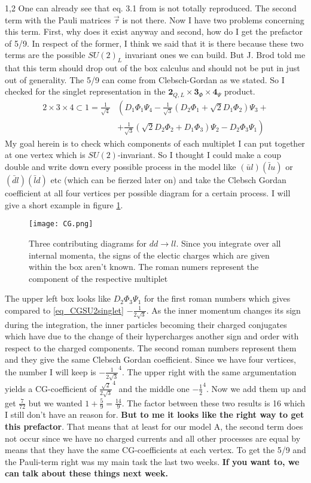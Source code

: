 \documentclass[11pt,a4paper,twoside]{article}
\begin{document}
\begin{spacing}{1,2}
One can already see that eq. 3.1 from \cite{Grip} is not totally reproduced. The second term with the Pauli matrices $\vec \tau$ is not there.
Now I have two problems concerning this term. First, why does it exist anyway and second, how do I get the prefactor of 5/9. In respect of the former, I think
we said that it is there because these two terms are the possible $SU(2)_L$ invariant ones we can build. But J. Brod told me that this term should drop out 
of the box calculus and should not be put in just out of generality. The 5/9 can come from Clebsch-Gordan as we stated. So I checked for the singlet
representation in the $\textbf{2}_{Q,L}\times\textbf{3}_\Phi\times\textbf{4}_\Psi$ product. 
\begin{align}
 \nonumber
 2\times3\times4 \subset 1 =\frac{1}{\sqrt4}&\left(D_1\Phi_1\Psi_4 - \frac{1}{\sqrt{3}}(D_2\Phi_1+\sqrt{2}D_1\Phi_2)\Psi_3  + \right. \\ 
  &+\left.\frac{1}{\sqrt{3}}(\sqrt{2}D_2\Phi_2+D_1\Phi_3)\Psi_2 - D_2\Phi_3\Psi_1  \right)
\label{eq_CGSU2singlet}
 \end{align}
My goal herein is to check which components of each multiplet I can put together at one vertex which is $SU(2)$-invariant. So I thought I could make a 
coup double and write down every possible process in the model like $(\bar u l)(\bar l u)$ or $(\bar d l)(\bar l d)$ etc (which can be fierzed later on)
and take the Clebsch Gordan coefficient at all four vertices per possible diagram for a certain process. I will give a short example in figure \ref{pic_CG}.
\begin{figure}[t]
 \texttt{[image: CG.png]}
 \caption{Three contributing diagrams for $dd\rightarrow ll$. Since you integrate over all internal momenta, the signs of the electic charges which are given
 within the box aren't known. The roman numers represent the component of the respective multiplet}
 \label{pic_CG}
\end{figure}
The upper left box looks like $D_2\Phi_3\Psi_1$ for the first roman numbers which gives compared to \eqref{eq_CGSU2singlet}  $-\frac{1}{2\sqrt{3}}$. 
As the inner momentum changes its sign during the integration, the inner particles becoming their charged conjugates which have due to the change of their
hypercharges another sign and order with respect to the charged components. The second roman numbers represent them and they give the same Clebsch Gordan
coefficient. Since we have four vertices, the number I will keep is $-\frac{1}{2\sqrt{3}}^4$. The upper right with the same argumentation yields a CG-coefficient
of $\frac{\sqrt{2}}{2\sqrt{3}}^4$ and the middle one $-\frac{1}{2}^4$. Now we add them up and get $\frac{7}{72}$ but we wanted $1+\frac59 = \frac{14}{9}$.
The factor between these two results is 16 which I still don't have an reason for. \textbf{But to me it looks like the right way to get this prefactor}.
That means that at least for our model A, the second term does not occur since we have no charged currents and all other processes are equal by means 
that they have the same CG-coefficients at each vertex. To get the 5/9 and the Pauli-term right was my main task the last two weeks. \textbf{If you want to, we
can talk about these things next week.}


\end{spacing}
\end{document}
